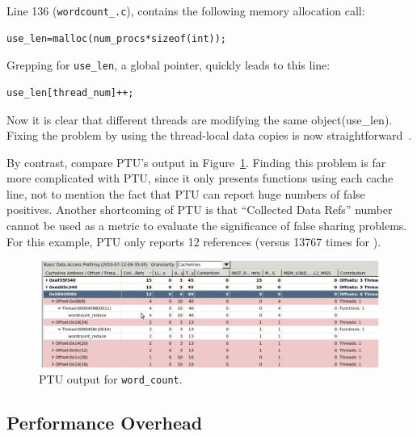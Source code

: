 Line 136 (\texttt{wordcount\_\pthreads{}.c}), contains the following memory allocation call:

\begin{verbatim}
use_len=malloc(num_procs*sizeof(int));
\end{verbatim}

Grepping for \texttt{use\_len}, a global pointer, quickly leads to this line:

\begin{verbatim}
use_len[thread_num]++;
\end{verbatim}

Now it is clear that different threads are modifying the same object(use\_len). Fixing the problem by using the
thread-local data copies is now straightforward~\cite{detect:intel}.

By contrast, compare PTU's output in Figure~\ref{fig:wordcount}. Finding this problem is far more complicated with PTU, since it only presents functions using each cache line, not to mention the fact that PTU can
report huge numbers of false positives.  Another shortcoming
of PTU is that ``Collected Data Refs'' number cannot be used as a metric to evaluate the significance of false sharing problems. For this example, PTU only reports 12 references (versus 13767 times for \sheriffdetect{}).

\begin{figure}[!t]
\centering
\includegraphics[width=6in]{sheriff/figure/wordcount}
\caption{PTU output for \texttt{word\_count}.
\label{fig:wordcount}}
\end{figure}


\subsection{\sheriffdetect{} Performance Overhead}
\label{sec:results-runtime-overhead}

